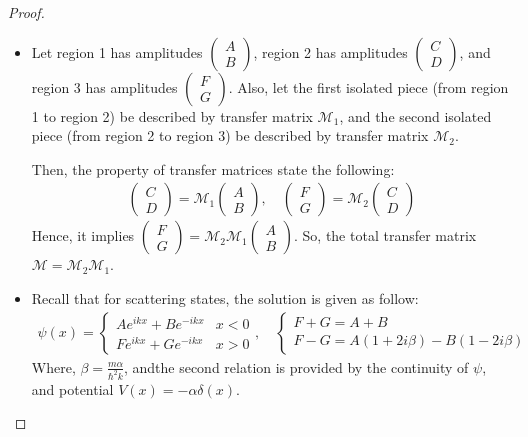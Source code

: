\documentclass{article}
\begin{document}
\begin{proof}
\begin{itemize}
    \hfil

    \item[b.] Let region 1 has amplitudes $\begin{pmatrix}A\\B\end{pmatrix}$, region 2 has amplitudes $\begin{pmatrix}C\\D\end{pmatrix}$, and region 3 has amplitudes $\begin{pmatrix}F\\G\end{pmatrix}$. Also, let the first isolated piece (from region 1 to region 2) be described by transfer matrix $\mathcal{M}_1$, and the second isolated piece (from region 2 to region 3) be described by transfer matrix $\mathcal{M}_2$. 
    
    Then, the property of transfer matrices state the following:
    \begin{align}
        \begin{pmatrix}
            C\\D
        \end{pmatrix}=\mathcal{M}_1\begin{pmatrix}
            A\\B
        \end{pmatrix},\quad \begin{pmatrix}
            F\\G
        \end{pmatrix}=\mathcal{M}_2\begin{pmatrix}
            C\\D
        \end{pmatrix}
    \end{align}
    Hence, it implies $\begin{pmatrix}F\\G\end{pmatrix} = \mathcal{M}_2\mathcal{M}_1\begin{pmatrix}A\\B\end{pmatrix}$. So, the total transfer matrix $\mathcal{M}=\mathcal{M}_2\mathcal{M}_1$.

    \hfil

    \item[c.] Recall that for scattering states, the solution is given as follow:
    \begin{align}
        \psi(x)=\begin{cases}
            Ae^{ikx}+Be^{-ikx} & x<0\\
            Fe^{ikx}+Ge^{-ikx} & x>0
        \end{cases},\quad \begin{cases}
            F+G=A+B\\
            F-G=A(1+2i\beta)-B(1-2i\beta)
        \end{cases}
    \end{align}
    Where, $\beta=\frac{m\alpha}{\hbar^2k}$, andthe second relation is provided by the continuity of $\psi$, and potential $V(x)=-\alpha\delta(x)$.


\end{itemize}
\end{proof}
\end{document}
